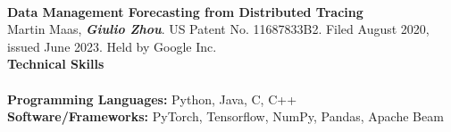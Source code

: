 \documentclass{article}
\begin{document}

% 

\vspace{0mm}
\noindent
\hspace{-2.0mm}{\large Patents}\vspace{0.5mm}\\
\textbf{Data Management Forecasting from Distributed Tracing} \\
\indent
\hspace{-4.5mm}
{\small Martin Maas, \textit{\textbf{Giulio Zhou}}. US Patent No. 11687833B2. Filed August 2020, issued June 2023. Held by Google Inc.} \\


\setlength{\leftskip}{0mm}
\noindent
\vspace{2mm}
\hspace{-2.7mm}
\textbf{\Large Technical Skills}\\[-4mm]
\HRule\\
\textbf{Programming Languages:} Python, Java, C, C++ \\
\textbf{Software/Frameworks:} PyTorch, Tensorflow, NumPy, Pandas, Apache Beam


\setlength{\leftskip}{0mm}
\newpage
\end{document}
